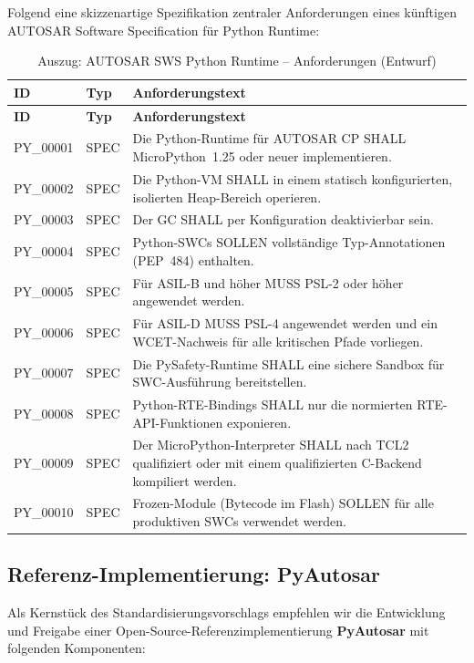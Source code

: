 ﻿\documentclass[12pt,a4paper,twoside]{article}
\begin{document}
Folgend eine skizzenartige Spezifikation zentraler Anforderungen eines
künftigen AUTOSAR Software Specification für Python Runtime:

\begin{longtable}{llp{7cm}}
\caption{Auszug: AUTOSAR SWS Python Runtime -- Anforderungen (Entwurf)}
\label{tab:sws_draft}\\
\toprule
\textbf{ID} & \textbf{Typ} & \textbf{Anforderungstext} \\
\midrule
\endfirsthead
\toprule
\textbf{ID} & \textbf{Typ} & \textbf{Anforderungstext} \\
\midrule
\endhead
\bottomrule
\endfoot
PY\_00001 & SPEC & Die Python-Runtime für AUTOSAR CP SHALL MicroPython~1.25 oder neuer implementieren. \\
PY\_00002 & SPEC & Die Python-VM SHALL in einem statisch konfigurierten, isolierten Heap-Bereich operieren. \\
PY\_00003 & SPEC & Der GC SHALL per Konfiguration deaktivierbar sein. \\
PY\_00004 & SPEC & Python-SWCs SOLLEN vollständige Typ-Annotationen (PEP~484) enthalten. \\
PY\_00005 & SPEC & Für ASIL-B und höher MUSS PSL-2 oder höher angewendet werden. \\
PY\_00006 & SPEC & Für ASIL-D MUSS PSL-4 angewendet werden und ein WCET-Nachweis für alle kritischen Pfade vorliegen. \\
PY\_00007 & SPEC & Die PySafety-Runtime SHALL eine sichere Sandbox für SWC-Ausführung bereitstellen. \\
PY\_00008 & SPEC & Python-RTE-Bindings SHALL nur die normierten RTE-API-Funktionen exponieren. \\
PY\_00009 & SPEC & Der MicroPython-Interpreter SHALL nach TCL2 qualifiziert oder mit einem qualifizierten C-Backend kompiliert werden. \\
PY\_00010 & SPEC & Frozen-Module (Bytecode im Flash) SOLLEN für alle produktiven SWCs verwendet werden. \\
\end{longtable}

\subsection{Referenz-Implementierung: PyAutosar}
\label{subsec:pyautosar_impl}

Als Kernstück des Standardisierungsvorschlags empfehlen wir die
Entwicklung und Freigabe einer Open-Source-Referenzimplementierung
\textbf{PyAutosar} mit folgenden Komponenten:
\end{document}
